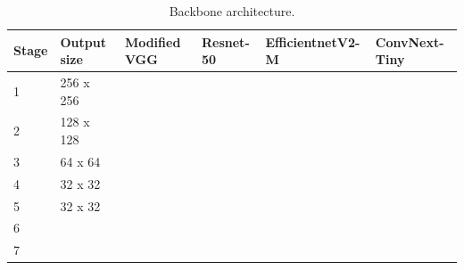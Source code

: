 \documentclass[journal]{IEEEtran}
\begin{document}
\begin{table}[]
\begin{tabular}{l|l|l|l|l|l}
Stage & Output size & Modified VGG & Resnet-50 & EfficientnetV2-M & ConvNext-Tiny \\ \hline
1     & 256 x 256   &              &     & \makecell{\effone} &               \\ \hline
2     & 128 x 128   &              & \makecell{\resone}  & \makecell{\efftwo}  & \makecell{\convnextone} \\ \hline
3     & 64 x 64     &              &           & \makecell{\effthree} & \makecell{\convnexttwo}   \\ \hline
4     & 32 x 32     &              &           & \makecell{\efffour}  & \makecell{\convnextthree}  \\ \hline
5     & 32 x 32     &              &           & \makecell{\efffive}  & \makecell{\convnextfour}   \\ \hline
6     &             &              &           &                  &               \\ \hline
7     &             &              &           &                  &              
\end{tabular}
\caption{\label{backbone_arch} Backbone architecture.}
\end{table}

\end{document}
